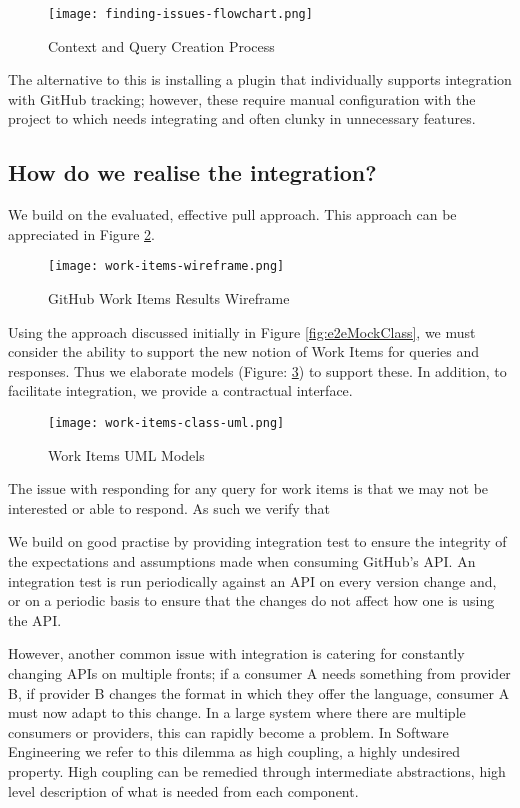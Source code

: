 \begin{figure}[h!]
	\centering
	\texttt{[image: finding-issues-flowchart.png]}
	\caption{Context and Query Creation Process}
	\label{fig:findingInformationStandardWay}
\end{figure}

The alternative to this is installing a plugin that individually supports integration with GitHub tracking; however, these require manual configuration with the project to which needs integrating and often clunky in unnecessary features.

\subsection{How do we realise the integration?}

We build on the evaluated, effective pull approach. This approach can be appreciated in Figure \ref{fig:gitHubWorkItemsWireframe}.

\begin{figure}[h!]
	\centering
	\texttt{[image: work-items-wireframe.png]}
	\label{fig:gitHubWorkItemsWireframe}
	\caption{GitHub Work Items Results Wireframe}
\end{figure}

Using the approach discussed initially in Figure \ref{fig:e2eMockClass}, we must consider the ability to support the new notion of Work Items for queries and responses. Thus we elaborate models (Figure: \ref{fig:workItemsUMLModels}) to support these. In addition, to facilitate integration, we provide a contractual interface.

\begin{figure}[h!]
	\centering
	\texttt{[image: work-items-class-uml.png]}
	\caption{Work Items UML Models}
	\label{fig:workItemsUMLModels}
\end{figure}

The issue with responding for any query for work items is that we may not be interested or able to respond. As such we verify that 

We build on good practise \parencite{gamma1995design} \parencite{martin2009clean} by providing integration test to ensure the integrity of the expectations and assumptions made when consuming GitHub's API. An integration test is run periodically against an API on every version change and, or on a periodic basis to ensure that the changes do not affect how one is using the API.

However, another common issue with integration is catering for constantly changing APIs on multiple fronts; if a consumer A needs something from provider B, if provider B changes the format in which they offer the language, consumer A must now adapt to this change. In a large system where there are multiple consumers or providers, this can rapidly become a problem. In Software Engineering we refer to this dilemma as high coupling, a highly undesired property. High coupling can be remedied through intermediate abstractions, high level description of what is needed from each component. 

